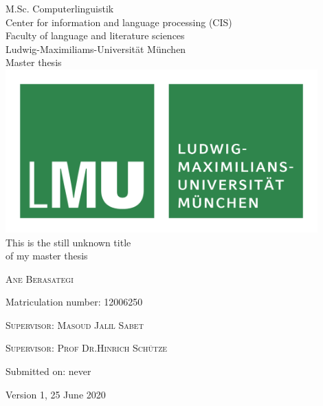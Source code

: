 %
%

\begin{titlepage}
	\begin{center}
		\normalsize
		M.Sc. Computerlinguistik \\
		Center for information and language processing (CIS)  \\
		Faculty of language and literature sciences \\
		Ludwig-Maximiliams-Universität München \\
		\vspace{1cm} %
		\huge
		Master thesis \\
		\vspace{1.5cm}
		\includegraphics[width=12cm]{figures/lmu_logo.png} \\ %
		\vspace{1cm}
		\Large
		This is the still unknown title \\
		of my master thesis \\
		{\Large\scshape Ane Berasategi \par}
		\normalsize
		{Matriculation number: 12006250 \par}
		\vfill
		\vspace{1.5cm}
		{\scshape Supervisor: Masoud Jalil Sabet \par}
		{\scshape Supervisor: Prof Dr.Hinrich Schütze \par}
		{Submitted on: never \par} %
		\vspace{1cm}
		\tiny Version 1, 25 June 2020
	\end{center}
	\vfill %
\end{titlepage}

